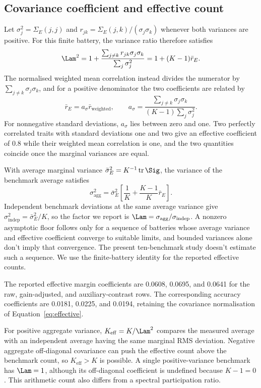 \subsection{Covariance coefficient and effective count}
Let $\sigma_j^2=\Sigma_E(j,j)$ and $r_{jk}=\Sigma_E(j,k)/(\sigma_j\sigma_k)$ whenever both variances are positive. For this finite battery, the variance ratio therefore satisfies
\begin{equation}
\Lam^2=1+\frac{\sum_{j\ne k}r_{jk}\sigma_j\sigma_k}{\sum_j\sigma_j^2}
=1+(K-1)\bar r_E.
\end{equation}
The normalised weighted mean correlation instead divides the numerator by $\sum_{j\ne k}\sigma_j\sigma_k$, and for a positive denominator the two coefficients are related by
\begin{equation}
\bar r_E=a_\sigma\bar r_{\mathrm{weighted}},\qquad
a_\sigma=\frac{\sum_{j\ne k}\sigma_j\sigma_k}{(K-1)\sum_j\sigma_j^2}.
\end{equation}
For nonnegative standard deviations, $a_\sigma$ lies between zero and one. Two perfectly correlated traits with standard deviations one and two give an effective coefficient of 0.8 while their weighted mean correlation is one, and the two quantities coincide once the marginal variances are equal.

With average marginal variance $\bar\sigma_E^2=K^{-1}\operatorname{tr}\Sig$, the variance of the benchmark average satisfies
\begin{equation}
\sigma_{\mathrm{agg}}^2=\bar\sigma_E^2\left[\frac1K+\frac{K-1}{K}\bar r_E\right]. \end{equation}
Independent benchmark deviations at the same average variance give $\sigma_{\mathrm{indep}}^2=\bar\sigma_E^2/K$, so the factor we report is $\Lam=\sigma_{\mathrm{agg}}/\sigma_{\mathrm{indep}}$. A nonzero asymptotic floor follows only for a sequence of batteries whose average variance and effective coefficient converge to suitable limits, and bounded variances alone don't imply that convergence. The present ten-benchmark study doesn't estimate such a sequence. We use the finite-battery identity for the reported effective counts.

The reported effective margin coefficients are 0.0608, 0.0695, and 0.0641 for the raw, gain-adjusted, and auxiliary-contrast rows. The corresponding accuracy coefficients are 0.0181, 0.0225, and 0.0194, retaining the covariance normalisation of Equation~\ref{eq:effective}.

For positive aggregate variance, $K_{\mathrm{eff}}=K/\Lam^2$ compares the measured average with an independent average having the same marginal RMS deviation. Negative aggregate off-diagonal covariance can push the effective count above the benchmark count, so $K_{\mathrm{eff}}>K$ is possible. A single positive-variance benchmark has $\Lam=1$, although its off-diagonal coefficient is undefined because $K-1=0$. This arithmetic count also differs from a spectral participation ratio.

